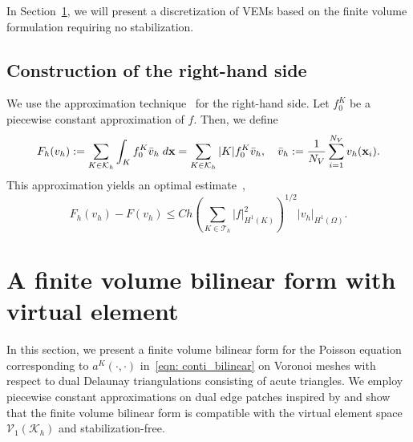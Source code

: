 \documentclass[a4paper]{article}
\theoremstyle{plain}
\theoremstyle{definition}
\numberwithin{equation}{section}
\begin{document}
In Section~\ref{sec: fvm_vem}, we will present a discretization of VEMs based on the finite volume formulation requiring no stabilization. 


\subsection{Construction of the right-hand side}\label{subsec: right hand side}

We use the approximation technique~\cite{BEI13} for the right-hand side. Let $f_0^K$ be a piecewise constant approximation of $f$. Then, we define
\begin{equation*}
F_h(v_h) := \sum_{K\in\mathcal{K}_h}\int_K f_0^K\bar{v}_h\;{\rm d}\mathbf{x}=\sum_{K\in\mathcal{K}_h}|K|f_0^K\bar{v}_h,\quad \bar{v}_h:=\frac{1}{N_V}\sum_{i=1}^{N_V} v_h(\mathbf{x}_i).
\end{equation*}
This approximation yields an optimal estimate~\cite{BEI13},
\begin{equation}
F_h(v_h)-F(v_h)\leq Ch\left(\sum_{K\in\mathcal{T}_h}\left|f\right|_{H^1(K)}^2\right)^{1/2}\left|v_h\right|_{H^1(\Omega)}.\label{estimate of rhs}
\end{equation}







\section{A finite volume bilinear form with virtual element}\label{sec: fvm_vem}
In this section, we present a finite volume bilinear form for the Poisson equation corresponding to $a^K(\cdot,\cdot)$ in~\eqref{eqn: conti_bilinear} on Voronoi meshes with respect to dual Delaunay triangulations consisting of acute triangles.
We employ piecewise constant approximations on dual edge patches inspired by \cite{brezzi2006error} and show that the finite volume bilinear form is compatible with 
the virtual element space $\mathcal V_1(\mathcal{K}_h)$ and stabilization-free.


\end{document}
